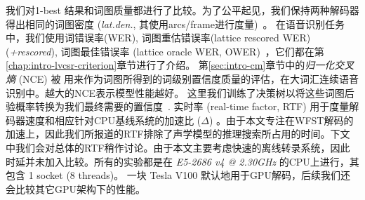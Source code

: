 
我们对1-best 结果和词图质量都进行了比较。为了公平起见，我们保持两种解码器得出相同的词图密度 ({\em{lat.den.}}, 其使用arcs/frame进行度量)~\cite{woodland19951994}。
在语音识别任务中，我们使用词错误率(WER), 词图重估错误率(lattice rescored WER) ({\em{+rescored}}), 词图最佳错误率 (lattice oracle WER, OWER)~\cite{hoffmeister2006frame}，它们都在第\ref{chap:intro-lvcsr-criterion}章节进行了介绍。
第\ref{sec:intro-cm}章节中的{\em 归一化交叉熵 } (NCE) \cite{zhc00-chen-icassp2017}被 用来作为词图所得到的词级别置信度质量的评估，在大词汇连续语音识别中。越大的NCE表示模型性能越好。
这里我们训练了决策树以将这些词图后验概率转换为我们最终需要的置信度~\cite{chen2017confidence,chen2017unified}.
实时率 (real-time factor, RTF) 用于度量解码器速度和相应针对CPU基线系统的加速比 ($\Delta$) 。由于本文专注在WFST解码的加速上，因此我们所报道的RTF排除了声学模型的推理搜索所占用的时间。下文中我们会对总体的RTF稍作讨论。由于本文主要考虑快速的离线转录系统，因此时延并未加入比较。所有的实验都是在  {\em{E5-2686 v4 @ 2.30GHz}} 的CPU上进行，其包含 1 socket (8 threads)。 %
一块 Tesla V100 默认地用于GPU解码，后续我们还会比较其它GPU架构下的性能。


